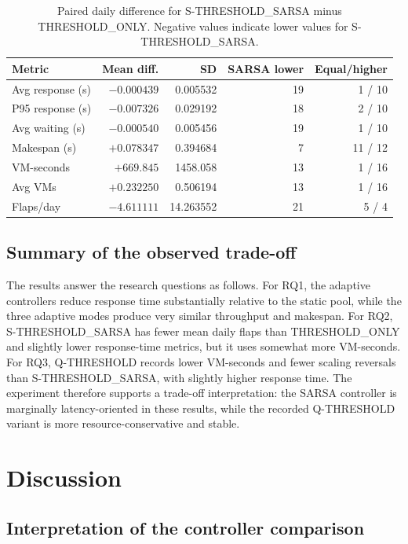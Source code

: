 \documentclass[pdflatex,sn-mathphys-num]{sn-jnl}
\begin{document}
\begin{table}[t]
\caption{Paired daily difference for S-THRESHOLD\_SARSA minus THRESHOLD\_ONLY. Negative values indicate lower values for S-THRESHOLD\_SARSA.}
\label{tab:paired}
\centering
\scriptsize
\setlength{\tabcolsep}{3pt}
\begin{tabular}{lrrrr}
\toprule
Metric & Mean diff. & SD & SARSA lower & Equal/higher \\
\midrule
Avg response (s) & $-0.000439$ & 0.005532 & 19 & 1 / 10 \\
P95 response (s) & $-0.007326$ & 0.029192 & 18 & 2 / 10 \\
Avg waiting (s) & $-0.000540$ & 0.005456 & 19 & 1 / 10 \\
Makespan (s) & $+0.078347$ & 0.394684 & 7 & 11 / 12 \\
VM-seconds & $+669.845$ & 1458.058 & 13 & 1 / 16 \\
Avg VMs & $+0.232250$ & 0.506194 & 13 & 1 / 16 \\
Flaps/day & $-4.611111$ & 14.263552 & 21 & 5 / 4 \\
\bottomrule
\end{tabular}
\end{table}

\subsection{Summary of the observed trade-off}

The results answer the research questions as follows. For RQ1, the adaptive controllers reduce response time substantially relative to the static pool, while the three adaptive modes produce very similar throughput and makespan. For RQ2, S-THRESHOLD\_SARSA has fewer mean daily flaps than THRESHOLD\_ONLY and slightly lower response-time metrics, but it uses somewhat more VM-seconds. For RQ3, Q-THRESHOLD records lower VM-seconds and fewer scaling reversals than S-THRESHOLD\_SARSA, with slightly higher response time. The experiment therefore supports a trade-off interpretation: the SARSA controller is marginally latency-oriented in these results, while the recorded Q-THRESHOLD variant is more resource-conservative and stable.

\section{Discussion}\label{sec:discussion}

\subsection{Interpretation of the controller comparison}
\end{document}
